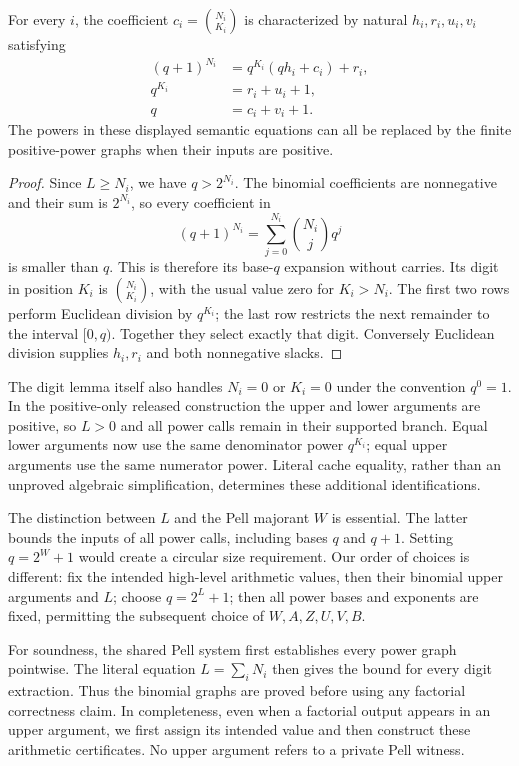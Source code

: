 \begin{lemma}
\label{lem:sa-common-radix}
For every $i$, the coefficient $c_i=\binom{N_i}{K_i}$ is characterized
by natural $h_i,r_i,u_i,v_i$ satisfying
\begin{align*}
 (q+1)^{N_i}&=q^{K_i}(qh_i+c_i)+r_i,\\
 q^{K_i}&=r_i+u_i+1,\\
 q&=c_i+v_i+1.
\end{align*}
The powers in these displayed semantic equations can all be replaced
by the finite positive-power graphs when their inputs are positive.
\end{lemma}

\begin{proof}
Since $L\geq N_i$, we have $q>2^{N_i}$.  The binomial coefficients
are nonnegative and their sum is $2^{N_i}$, so every coefficient in
\[
 (q+1)^{N_i}=\sum_{j=0}^{N_i}\binom{N_i}{j}q^j
\]
is smaller than $q$.  This is therefore its base-$q$ expansion without
carries.  Its digit in position $K_i$ is $\binom{N_i}{K_i}$, with the
usual value zero for $K_i>N_i$.
The first two rows perform Euclidean division by $q^{K_i}$; the last
row restricts the next remainder to the interval $[0,q)$.
Together they select exactly that digit.  Conversely Euclidean
division supplies $h_i,r_i$ and both nonnegative slacks.
\end{proof}

The digit lemma itself also handles $N_i=0$ or $K_i=0$ under the
convention $q^0=1$.  In the positive-only released construction the
upper and lower arguments are positive, so $L>0$ and all power calls
remain in their supported branch.  Equal lower arguments now use the
same denominator power $q^{K_i}$; equal upper arguments use the same
numerator power.  Literal cache equality, rather than an unproved
algebraic simplification, determines these additional identifications.

The distinction between $L$ and the Pell majorant $W$ is essential.
The latter bounds the inputs of all power calls, including bases $q$
and $q+1$.  Setting $q=2^W+1$ would create a circular size requirement.
Our order of choices is different: fix the intended high-level arithmetic
values, then their binomial upper arguments and $L$; choose $q=2^L+1$;
then all power bases and exponents are fixed, permitting the subsequent
choice of $W,A,Z,U,V,B$.

For soundness, the shared Pell system first establishes every power
graph pointwise.  The literal equation $L=\sum_iN_i$ then gives the
bound for every digit extraction.  Thus the binomial graphs are proved
before using any factorial correctness claim.  In completeness, even
when a factorial output appears in an upper argument, we first assign
its intended value and then construct these arithmetic certificates.
No upper argument refers to a private Pell witness.

